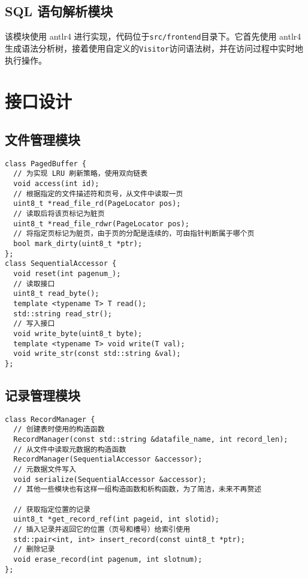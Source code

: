 \documentclass{ctexart}
\begin{document}
\subsection{SQL 语句解析模块}
该模块使用 antlr4 进行实现，代码位于\texttt{src/frontend}目录下。它首先使用 antlr4 生成语法分析树，接着使用自定义的\texttt{Visitor}访问语法树，并在访问过程中实时地执行操作。

\section{接口设计}
\subsection{文件管理模块}
\begin{mdframed}
	\begin{verbatim}
class PagedBuffer {
  // 为实现 LRU 刷新策略，使用双向链表
  void access(int id);
  // 根据指定的文件描述符和页号，从文件中读取一页
  uint8_t *read_file_rd(PageLocator pos);
  // 读取后将该页标记为脏页
  uint8_t *read_file_rdwr(PageLocator pos);
  // 将指定页标记为脏页，由于页的分配是连续的，可由指针判断属于哪个页
  bool mark_dirty(uint8_t *ptr);
};
class SequentialAccessor {
  void reset(int pagenum_);
  // 读取接口
  uint8_t read_byte();
  template <typename T> T read();
  std::string read_str();
  // 写入接口
  void write_byte(uint8_t byte);
  template <typename T> void write(T val);
  void write_str(const std::string &val);
};
\end{verbatim}
\end{mdframed}

\subsection{记录管理模块}

\begin{mdframed}
	\begin{verbatim}
class RecordManager {
  // 创建表时使用的构造函数
  RecordManager(const std::string &datafile_name, int record_len);
  // 从文件中读取元数据的构造函数
  RecordManager(SequentialAccessor &accessor);
  // 元数据文件写入
  void serialize(SequentialAccessor &accessor);
  // 其他一些模块也有这样一组构造函数和析构函数，为了简洁，未来不再赘述

  // 获取指定位置的记录
  uint8_t *get_record_ref(int pageid, int slotid);
  // 插入记录并返回它的位置（页号和槽号）给索引使用
  std::pair<int, int> insert_record(const uint8_t *ptr);
  // 删除记录
  void erase_record(int pagenum, int slotnum);
};
\end{verbatim}
\end{mdframed}
\end{document}
